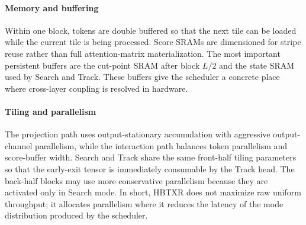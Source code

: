 \documentclass[journal]{IEEEtran}
\begin{document}
\paragraph*{Memory and buffering}
Within one block, tokens are double buffered so that the next tile can be loaded while the current tile is being processed. Score SRAMs are dimensioned for stripe reuse rather than full attention-matrix materialization. The most important persistent buffers are the cut-point SRAM after block $L/2$ and the state SRAM used by Search and Track. These buffers give the scheduler a concrete place where cross-layer coupling is resolved in hardware.

\paragraph*{Tiling and parallelism}
The projection path uses output-stationary accumulation with aggressive output-channel parallelism, while the interaction path balances token parallelism and score-buffer width. Search and Track share the same front-half tiling parameters so that the early-exit tensor is immediately consumable by the Track head. The back-half blocks may use more conservative parallelism because they are activated only in Search mode. In short, HBTXR does not maximize raw uniform throughput; it allocates parallelism where it reduces the latency of the mode distribution produced by the scheduler.
\end{document}
